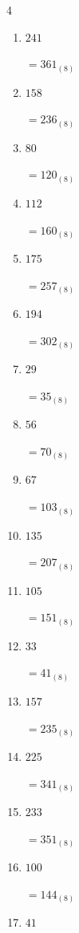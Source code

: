 \begin{multicols}{4}
\begin{enumerate}
  \item $241$

        $=361_{(8)}$

  \item $158$

        $=236_{(8)}$

  \item $80$

        $=120_{(8)}$

  \item $112$

        $=160_{(8)}$

  \item $175$

        $=257_{(8)}$

  \item $194$

        $=302_{(8)}$

  \item $29$

        $=35_{(8)}$

  \item $56$

        $=70_{(8)}$

  \item $67$

        $=103_{(8)}$

  \item $135$

        $=207_{(8)}$

  \item $105$

        $=151_{(8)}$

  \item $33$

        $=41_{(8)}$

  \item $157$

        $=235_{(8)}$

\columnbreak %

  \item $225$

        $=341_{(8)}$

  \item $233$

        $=351_{(8)}$

  \item $100$

        $=144_{(8)}$

  \item $41$


\end{enumerate}
\end{multicols}
